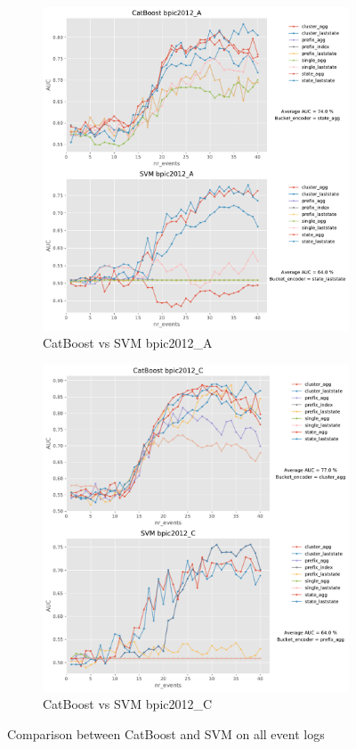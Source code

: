 \documentclass[twoside,11pt]{Latex/Classes/PhDthesisPSnPDF}
\begin{document}
\begin{figure}[t!]
	\medskip
	\begin{subfigure}{0.48\textwidth}
		\includegraphics[width=\linewidth]{images/catboost/graphssvm/bpic2012_A_CatBoost_svm.pdf}
		\caption{CatBoost vs SVM bpic2012\_A} \label{fig:b12acs}
	\end{subfigure}\hspace*{\fill}
	\begin{subfigure}{0.48\textwidth}
		\includegraphics[width=\linewidth]{images/catboost/graphssvm/bpic2012_C_CatBoost_svm.pdf}
		\caption{CatBoost vs SVM bpic2012\_C} \label{fig:b12ccs}
	\end{subfigure}
\caption{Comparison between CatBoost and SVM on all event logs}
\label{fig:r1cs}
\end{figure}
\end{document}
